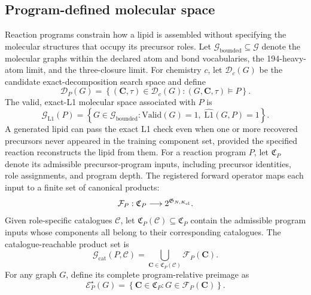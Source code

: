 \documentclass{article}
\begin{document}
\subsection{Program-defined molecular space}

Reaction programs constrain how a lipid is assembled without specifying the molecular structures
that occupy its precursor roles.
Let $\mathcal{G}_{\mathrm{bounded}}\subseteq\mathcal{G}$ denote the molecular graphs within the
declared atom and bond vocabularies, the 194-heavy-atom limit, and the three-closure limit.
For chemistry $c$, let $\mathcal D_c(G)$ be the candidate exact-decomposition search space and define
\begin{equation}
    \mathcal D_P(G)
    =\left\{(\mathbf C,\tau)\in\mathcal D_c(G):
    (G,\mathbf C,\tau)\models P\right\}.
\end{equation}
The valid, exact-L1 molecular space associated with $P$ is
\begin{equation}
    \mathcal{G}_{\mathrm{L1}}(P)
    =
    \left\{
        G\in\mathcal{G}_{\mathrm{bounded}}:
        \mathrm{Valid}(G)=1,\;
        \widehat{\mathrm{L1}}(G,P)=1
    \right\}.
\end{equation}
A generated lipid can pass the exact L1 check even when one or more recovered precursors never
appeared in the training component set, provided the specified reaction reconstructs the lipid from
them.
For a reaction program $P$, let $\mathfrak C_P$ denote its admissible precursor-program inputs, including
precursor identities, role assignments, and program depth.
The registered forward operator maps each input to a finite set of canonical products:
\begin{equation}
    \mathcal{F}_P:
    \mathfrak C_P
    \longrightarrow
    2^{\mathfrak{G}_{N,K_{\rm cl}}}.
\end{equation}
Given role-specific catalogues $\mathcal C$, let
$\mathfrak C_P(\mathcal C)\subseteq\mathfrak C_P$ contain the admissible program inputs whose
components all belong to their corresponding catalogues.
The catalogue-reachable product set is
\begin{equation}
    \mathcal{G}_{\mathrm{cat}}(P,\mathcal C)
    =
    \bigcup_{\mathbf C\in\mathfrak C_P(\mathcal C)}
    \mathcal{F}_P(\mathbf C).
\end{equation}
For any graph $G$, define its complete program-relative preimage as
\begin{equation}
    \mathcal{E}^{\star}_P(G)
    =
    \left\{
        \mathbf C\in\mathfrak C_P:
        G\in\mathcal{F}_P(\mathbf C)
    \right\}.
\end{equation}
\end{document}

